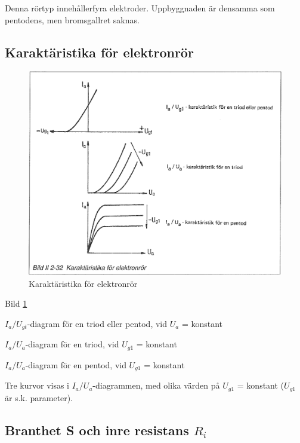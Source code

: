 Denna rörtyp innehållerfyra elektroder. Uppbyggnaden är densamma som pentodens,
men bromsgallret saknas.

\subsection{Karaktäristika för elektronrör}

\begin{figure}[h]
\begin{center}
\includegraphics[width=14cm]{images/bild_2_2-32}
\caption{Karaktäristika för elektronrör}
\label{fig:BildII2-32}
\end{center}
\end{figure}

Bild \ref{fig:BildII2-32}

\(I_a/U_{gt}\)-diagram för en triod eller pentod, vid \(U_a\) = konstant

\(I_a/U_a\)-diagram för en triod, vid \(U_{g1}\) = konstant

\(I_a/U_a\)-diagram för en pentod, vid \(U_{g1}\) = konstant

Tre kurvor visas i \(I_a/U_a\)-diagrammen, med olika värden på
\(U_{g1}\) = konstant (\(U_{g1}\) är s.k. parameter).

\subsection{Branthet S och inre resistans \(R_i\)}


